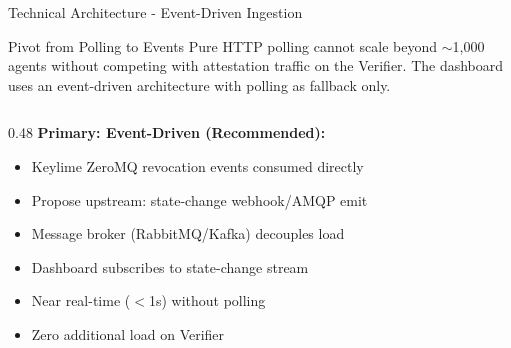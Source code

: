 \begin{frame}{Technical Architecture - Event-Driven Ingestion}
  \begin{block}{Pivot from Polling to Events}
    \scriptsize
    Pure HTTP polling cannot scale beyond $\sim$1,000 agents without competing with
    attestation traffic on the Verifier. The dashboard uses an event-driven
    architecture with polling as fallback only.
  \end{block}

  \vspace{0.05cm}

  \tiny
  \begin{columns}[T]
    \begin{column}{0.48\textwidth}
      \textbf{Primary: Event-Driven (Recommended):}
      \begin{itemize}
        \setlength{\itemsep}{0pt}
        \item Keylime ZeroMQ revocation events consumed directly
        \item Propose upstream: state-change webhook/AMQP emit
        \item Message broker (RabbitMQ/Kafka) decouples load
        \item Dashboard subscribes to state-change stream
        \item Near real-time ($<$1s) without polling
        \item Zero additional load on Verifier
      \end{itemize}

      \vspace{0.05cm}


\end{column}
\end{columns}
\end{frame}
